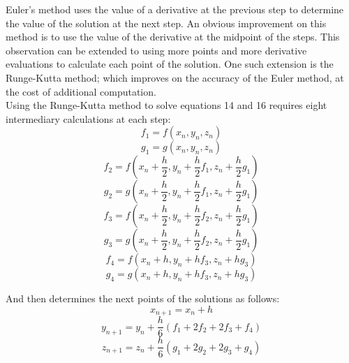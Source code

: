 \documentclass[10pt]{article}
\begin{document}
{Euler's method uses the value of a derivative at the previous step to determine the value of the solution at the next step. An obvious improvement on this method is to use the value of the derivative at the midpoint of the steps. This observation can be extended to using more points and more derivative evaluations to calculate each point of the solution. One such extension is the Runge-Kutta method; which improves on the accuracy of the Euler method, at the cost of additional computation.\\

Using the Runge-Kutta method to solve equations 14 and 16 requires eight intermediary calculations at each step:
\begin{equation} f_1 = f(x_n, y_n, z_n) \end{equation}
\begin{equation} g_1 = g(x_n, y_n, z_n) \end{equation}
\begin{equation} f_2 = f(x_n + \frac{h}{2}, y_n + \frac{h}{2}f_1, z_n + \frac{h}{2}g_1) \end{equation}
\begin{equation} g_2 = g(x_n + \frac{h}{2}, y_n + \frac{h}{2}f_1, z_n + \frac{h}{2}g_1) \end{equation}
\begin{equation} f_3 = f(x_n + \frac{h}{2}, y_n + \frac{h}{2}f_2, z_n + \frac{h}{2}g_1) \end{equation}
\begin{equation} g_3 = g(x_n + \frac{h}{2}, y_n + \frac{h}{2}f_2, z_n + \frac{h}{2}g_1) \end{equation}
\begin{equation} f_4 = f(x_n + h, y_n + hf_3, z_n + hg_3) \end{equation}
\begin{equation} g_4 = g(x_n + h, y_n + hf_3, z_n + hg_3) \end{equation}

And then determines the next points of the solutions as follows:
\begin{equation} x_{n+1} = x_n + h \end{equation}
\begin{equation} y_{n+1} = y_n + \frac{h}{6}(f_1 + 2f_2 + 2f_3 + f_4) \end{equation}
\begin{equation} z_{n+1} = z_n + \frac{h}{6}(g_1 + 2g_2 + 2g_3 + g_4) \end{equation}

}
\end{document}
